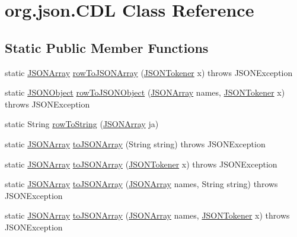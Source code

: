 \hypertarget{classorg_1_1json_1_1_c_d_l}{\section{org.\-json.\-C\-D\-L Class Reference}
\label{classorg_1_1json_1_1_c_d_l}
}
\subsection*{Static Public Member Functions}
\begin{DoxyCompactItemize}
\item 
static \hyperlink{classorg_1_1json_1_1_j_s_o_n_array}{J\-S\-O\-N\-Array} \hyperlink{classorg_1_1json_1_1_c_d_l_acecd36f26ee8966dea2cd9dcd5683331}{row\-To\-J\-S\-O\-N\-Array} (\hyperlink{classorg_1_1json_1_1_j_s_o_n_tokener}{J\-S\-O\-N\-Tokener} x)  throws J\-S\-O\-N\-Exception 
\item 
static \hyperlink{classorg_1_1json_1_1_j_s_o_n_object}{J\-S\-O\-N\-Object} \hyperlink{classorg_1_1json_1_1_c_d_l_a1903e6355ac99487c50bac0c70a618ff}{row\-To\-J\-S\-O\-N\-Object} (\hyperlink{classorg_1_1json_1_1_j_s_o_n_array}{J\-S\-O\-N\-Array} names, \hyperlink{classorg_1_1json_1_1_j_s_o_n_tokener}{J\-S\-O\-N\-Tokener} x)  throws J\-S\-O\-N\-Exception 
\item 
static String \hyperlink{classorg_1_1json_1_1_c_d_l_ad428294b24ca60b441e60fa6b7b168bc}{row\-To\-String} (\hyperlink{classorg_1_1json_1_1_j_s_o_n_array}{J\-S\-O\-N\-Array} ja)
\item 
static \hyperlink{classorg_1_1json_1_1_j_s_o_n_array}{J\-S\-O\-N\-Array} \hyperlink{classorg_1_1json_1_1_c_d_l_a0d7e17e87f97c37d9326e3347a8abf2b}{to\-J\-S\-O\-N\-Array} (String string)  throws J\-S\-O\-N\-Exception 
\item 
static \hyperlink{classorg_1_1json_1_1_j_s_o_n_array}{J\-S\-O\-N\-Array} \hyperlink{classorg_1_1json_1_1_c_d_l_ace400a8f91feb12d6d823757a7641f8b}{to\-J\-S\-O\-N\-Array} (\hyperlink{classorg_1_1json_1_1_j_s_o_n_tokener}{J\-S\-O\-N\-Tokener} x)  throws J\-S\-O\-N\-Exception 
\item 
static \hyperlink{classorg_1_1json_1_1_j_s_o_n_array}{J\-S\-O\-N\-Array} \hyperlink{classorg_1_1json_1_1_c_d_l_ae2085eaedac675d9fa3e151d5d8de607}{to\-J\-S\-O\-N\-Array} (\hyperlink{classorg_1_1json_1_1_j_s_o_n_array}{J\-S\-O\-N\-Array} names, String string)  throws J\-S\-O\-N\-Exception 
\item 
static \hyperlink{classorg_1_1json_1_1_j_s_o_n_array}{J\-S\-O\-N\-Array} \hyperlink{classorg_1_1json_1_1_c_d_l_af55973f9de779acb04e33b0198a5525c}{to\-J\-S\-O\-N\-Array} (\hyperlink{classorg_1_1json_1_1_j_s_o_n_array}{J\-S\-O\-N\-Array} names, \hyperlink{classorg_1_1json_1_1_j_s_o_n_tokener}{J\-S\-O\-N\-Tokener} x)  throws J\-S\-O\-N\-Exception 

\end{DoxyCompactItemize}
